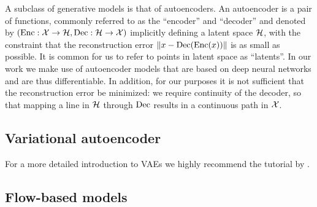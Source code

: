 \documentclass[../main.tex]{subfiles}
\begin{document}
A subclass of generative models is that of autoencoders.
An autoencoder is a pair of functions, commonly referred to as the ``encoder'' and ``decoder'' and denoted by $(\operatorname{Enc}: \mathcal{X} \to \mathcal{H}, \operatorname{Dec}: \mathcal{H} \to \mathcal{X})$ implicitly defining a latent space $\mathcal{H}$, with the constraint that the reconstruction error $\left\lVert x - \operatorname{Dec}(\operatorname{Enc}(x))\right\rVert$ is as small as possible.
It is common for us to refer to points in latent space as ``latents''.
In our work we make use of autoencoder models that are based on deep neural networks and are thus differentiable.
In addition, for our purposes it is not sufficient that the reconstruction error be minimized: we require continuity of the decoder, so that mapping a line in $\mathcal{H}$ through $\operatorname{Dec}$ results in a continuous path in $\mathcal{X}$.

\subsection{Variational autoencoder}


For a more detailed introduction to VAEs we highly recommend the tutorial by \citeauthor{doerschTutorial2021} \cite{doerschTutorial2021}.

\subsection{Flow-based models}
\end{document}
